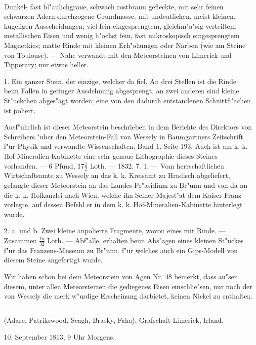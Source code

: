 \documentclass[a4paper, 11pt, oneside, polutonikogreek, german]{article}
\begin{document}
\paragraph{}
Dunkel- fast bl"aulichgraue, schwach rostbraun gefleckte, mit sehr feinen schwarzen Adern durchzogene Grundmasse, mit undeutlichen, meist kleinen, kugeligen Ausscheidungen; viel fein eingesprengtem, gleichm"a"sig verteiltem metallischen Eisen und wenig h"ochst fein, fast mikroskopisch eingesprengtem Magnetkies; matte Rinde mit kleinen Erh"ohungen oder Narben (wie am Steine von Toulouse). --- Nahe verwandt mit den Meteorsteinen von Limerick und Tipperary; nur etwas heller.

1. Ein ganzer Stein, der einzige, welcher da fiel. An drei Stellen ist die Rinde beim Fallen in geringer Ausdehnung abgesprengt, an zwei anderen sind kleine St"uckchen abges"agt worden; eine von den dadurch entstandenen Schnittfl"achen ist poliert.

Ausf"uhrlich ist dieser Meteorstein beschrieben in dem Berichte des Direktors von Schreibers "uber den Meteorstein-Fall von Wessely in Baumgartners Zeitschrift f"ur Physik und verwandte Wissenschaften, Band 1. Seite 193. Auch ist am k. k. Hof-Mineralien-Kabinette eine sehr genaue Lithographie dieses Steines vorhanden. --- 6 Pfund, $\mathfrak{17\frac{1}{2}}$ Loth. --- 1832. 7. 1. --- Vom herrschaftlichen Wirtschaftsamte zu Wessely an das k. k. Kreisamt zu Hradisch abgeliefert, gelangte dieser Meteorstein an das Landes-Pr"asidium zu Br"unn und von da an die k. k. Hofkanzlei nach Wien, welche ihn Seiner Majest"at dem Kaiser Franz vorlegte, auf dessen Befehl er in dem k. k. Hof-Mineralien-Kabinette hinterlegt wurde.

2. a. und b. Zwei kleine anpolierte Fragmente, wovon eines mit Rinde. --- Zusammen $\mathfrak{\frac{15}{32}}$ Loth. --- Abf"alle, erhalten beim Abs"agen eines kleinen St"uckes f"ur das Franzens-Museum zu Br"unn, f"ur welches auch ein Gips-Modell von diesem Steine angefertigt wurde.

\setlength{\leftskip}{10mm}
\setlength{\parindent}{0pt}

{\footnotesize Wir haben schon bei dem Meteorstein von Agen Nr. 48 bemerkt, dass au"ser diesem, unter allen Meteorsteinen die gediegenes Eisen einschlie"sen, nur noch der von Wessely die merk w"urdige Erscheinung darbietet, keinen Nickel zu enthalten.}

\setlength{\leftskip}{0pt}
\setlength{\parindent}{20pt}

\subsection{}
\begin{center}

(Adare, Patrikswood, Scagh, Brasky, Faha), Grafschaft Limerick, Irland.

10. September 1813, 9 Uhr Morgens.
\end{center}
\end{document}
